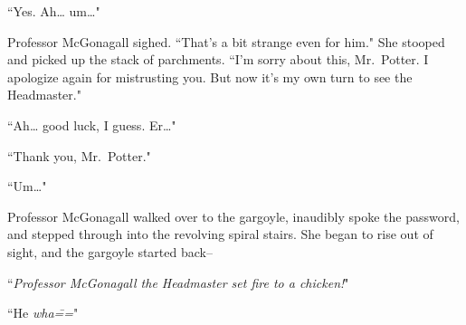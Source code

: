 ``Yes. Ah{\ldots} um{\ldots}"

Professor McGonagall sighed. ``That's a bit strange even for him." She stooped and picked up the stack of parchments. ``I'm sorry about this, Mr.~Potter. I apologize again for mistrusting you. But now it's my own turn to see the Headmaster."

``Ah{\ldots} good luck, I guess. Er{\ldots}"

``Thank you, Mr.~Potter."

``Um{\ldots}"

Professor McGonagall walked over to the gargoyle, inaudibly spoke the password, and stepped through into the revolving spiral stairs. She began to rise out of sight, and the gargoyle started back\---

``\emph{Professor McGonagall the Headmaster set fire to a chicken!}"

``He \emph{wha\===}"

